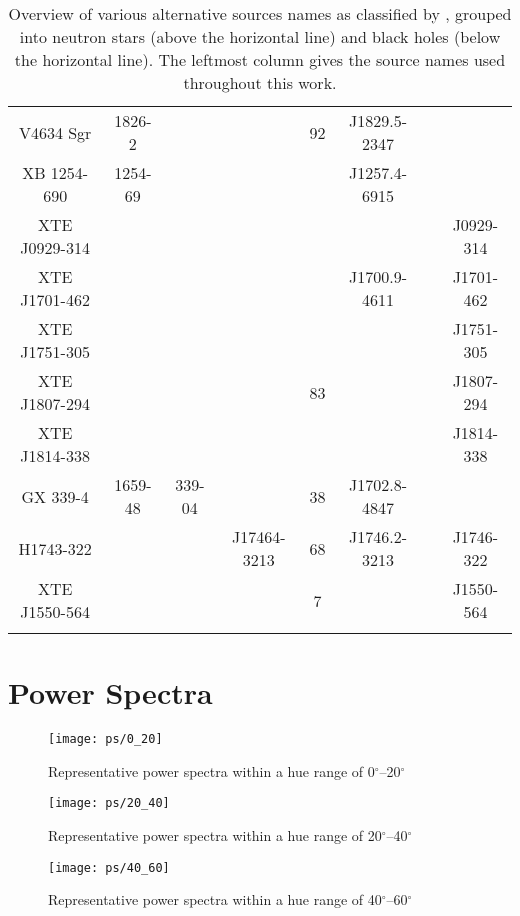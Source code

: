 \begin{landscape}
\begin{longtable}{cccccccc}
V4634 Sgr&1826-2& & &92&J1829.5-2347& & \\
XB 1254-690&1254-69& & & &J1257.4-6915& & \\
XTE J0929-314& & & & & & &J0929-314\\
XTE J1701-462& & & & &J1700.9-4611& &J1701-462\\
XTE J1751-305& & & & & & &J1751-305\\
XTE J1807-294& & & &83& & &J1807-294\\
XTE J1814-338& & & & & & &J1814-338\\
\midrule
GX 339-4&1659-48&339-04& &38&J1702.8-4847& & \\
H1743-322& & &J17464-3213&68&J1746.2-3213& &J1746-322\\
XTE J1550-564& & & &7& & &J1550-564\\
\bottomrule
\caption[Alternative source names]{Overview of various alternative sources names as classified by \citet{SIMBAD}, grouped into neutron stars (above the horizontal line) and black holes (below the horizontal line). The leftmost column gives the source names used throughout this work.}\label{tab:aka}
\end{longtable}
\end{landscape}

\chapter{Power Spectra}
\label{ch:psds}
\begin{figure}[p]
	\myfloatalign
	{\vspace*{-0.5cm}\hspace*{-1.5cm}\texttt{[image: ps/0\_20]}}
	\caption[Power spectra with a hue of 0$^\circ$--20$^\circ$]{Representative power spectra within a hue range of 0$^\circ$--20$^\circ$}\label{fig:ps_0_20}
\end{figure}
\captionsetup[figure]{list=no}
\begin{figure}[p]
	\myfloatalign
	{\vspace*{-0.5cm}\hspace*{-1.5cm}\texttt{[image: ps/20\_40]}}
	\caption[Power spectra with a hue of 20$^\circ$--40$^\circ$]{Representative power spectra within a hue range of 20$^\circ$--40$^\circ$}\label{fig:ps_20_40}
\end{figure}

\begin{figure}[p]
	{\vspace*{-0.5cm}\hspace*{-1.5cm}\texttt{[image: ps/40\_60]}}
	\caption[Power spectra with a hue of 40$^\circ$--60$^\circ$]{Representative power spectra within a hue range of 40$^\circ$--60$^\circ$}\label{fig:ps_40_60}
\end{figure}

